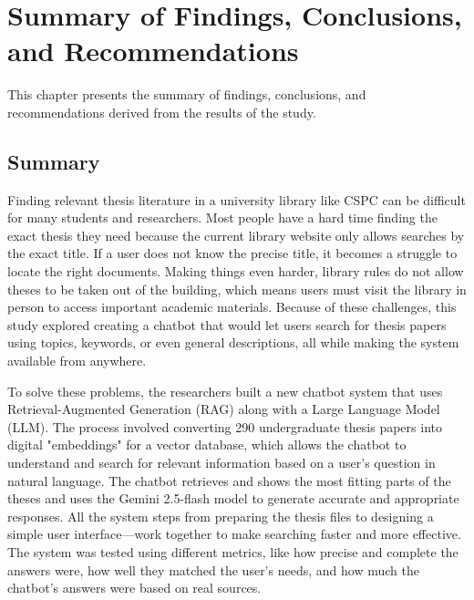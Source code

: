 \chapter{Summary of Findings, Conclusions, and Recommendations}
\begin{refsection}

This chapter presents the summary of findings, conclusions, and recommendations derived from the results of the study.

\section*{Summary}

Finding relevant thesis literature in a university library like CSPC can be difficult for many students and researchers. Most people have a hard time finding the exact thesis they need because the current library website only allows searches by the exact title. If a user does not know the precise title, it becomes a struggle to locate the right documents. Making things even harder, library rules do not allow theses to be taken out of the building, which means users must visit the library in person to access important academic materials. Because of these challenges, this study explored creating a chatbot that would let users search for thesis papers using topics, keywords, or even general descriptions, all while making the system available from anywhere.

To solve these problems, the researchers built a new chatbot system that uses Retrieval-Augmented Generation (RAG) along with a Large Language Model (LLM). The process involved converting 290 undergraduate thesis papers into digital "embeddings" for a vector database, which allows the chatbot to understand and search for relevant information based on a user's question in natural language. The chatbot retrieves and shows the most fitting parts of the theses and uses the Gemini 2.5-flash model to generate accurate and appropriate responses. All the system steps from preparing the thesis files to designing a simple user interface—work together to make searching faster and more effective. The system was tested using different metrics, like how precise and complete the answers were, how well they matched the user's needs, and how much the chatbot's answers were based on real sources.


\end{refsection}
